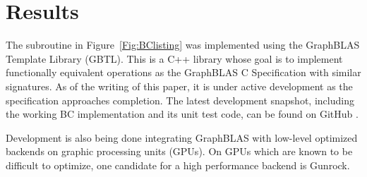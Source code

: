 \section{Results}
\label{sec:results}

The subroutine in Figure~\ref{Fig:BClisting} was implemented using the
GraphBLAS Template Library (GBTL)\cite{gbtl-cuda16}. This is a C++ library whose
goal is to implement functionally equivalent operations as the GraphBLAS C
Specification with similar signatures.  As of the writing of this paper, it is 
under active development as the specification approaches 
completion.  The latest development snapshot, including the working BC 
implementation and its unit test code, can be found on GitHub \cite{gbtl-github}.  

Development is also being done integrating GraphBLAS with low-level optimized backends on graphic processing units (GPUs). On GPUs which are known to be difficult to optimize, one candidate for a high performance backend is Gunrock\cite{topc17}.